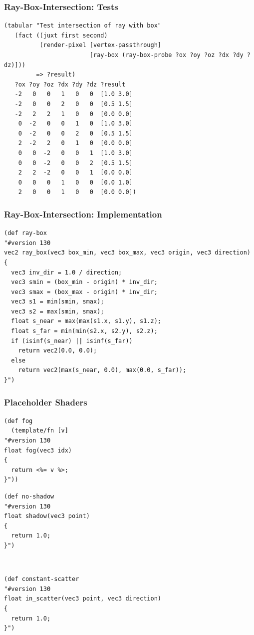 \documentclass[aspectratio=169,11pt,xcolor=dvipsnames]{beamer}
\begin{document}
\begin{frame}[fragile]
  \frametitle{Ray-Box-Intersection: Tests}
  \begin{verbatim}
(tabular "Test intersection of ray with box"
   (fact ((juxt first second)
          (render-pixel [vertex-passthrough]
                        [ray-box (ray-box-probe ?ox ?oy ?oz ?dx ?dy ?dz)]))
         => ?result)
   ?ox ?oy ?oz ?dx ?dy ?dz ?result
   -2   0   0   1   0   0  [1.0 3.0]
   -2   0   0   2   0   0  [0.5 1.5]
   -2   2   2   1   0   0  [0.0 0.0]
    0  -2   0   0   1   0  [1.0 3.0]
    0  -2   0   0   2   0  [0.5 1.5]
    2  -2   2   0   1   0  [0.0 0.0]
    0   0  -2   0   0   1  [1.0 3.0]
    0   0  -2   0   0   2  [0.5 1.5]
    2   2  -2   0   0   1  [0.0 0.0]
    0   0   0   1   0   0  [0.0 1.0]
    2   0   0   1   0   0  [0.0 0.0])
  \end{verbatim}
\end{frame}

\begin{frame}[fragile]
  \frametitle{Ray-Box-Intersection: Implementation}
  \begin{verbatim}
(def ray-box
"#version 130
vec2 ray_box(vec3 box_min, vec3 box_max, vec3 origin, vec3 direction)
{
  vec3 inv_dir = 1.0 / direction;
  vec3 smin = (box_min - origin) * inv_dir;
  vec3 smax = (box_max - origin) * inv_dir;
  vec3 s1 = min(smin, smax);
  vec3 s2 = max(smin, smax);
  float s_near = max(max(s1.x, s1.y), s1.z);
  float s_far = min(min(s2.x, s2.y), s2.z);
  if (isinf(s_near) || isinf(s_far))
    return vec2(0.0, 0.0);
  else
    return vec2(max(s_near, 0.0), max(0.0, s_far));
}")
  \end{verbatim}
\end{frame}

\begin{frame}[fragile]
  \frametitle{Placeholder Shaders}
  \begin{center}
    \begin{minipage}{0.48\textwidth}
      \begin{verbatim}
(def fog
  (template/fn [v]
"#version 130
float fog(vec3 idx)
{
  return <%= v %>;
}"))
      \end{verbatim}
    \end{minipage}
    \begin{minipage}{0.48\textwidth}
      \begin{verbatim}
(def no-shadow
"#version 130
float shadow(vec3 point)
{
  return 1.0;
}")
      \end{verbatim}
    \end{minipage}\bigskip\\
    \begin{minipage}{0.48\textwidth}
      \begin{verbatim}
(def constant-scatter
"#version 130
float in_scatter(vec3 point, vec3 direction)
{
  return 1.0;
}")
      \end{verbatim}
    \end{minipage}
  \end{center}
\end{frame}
\end{document}
